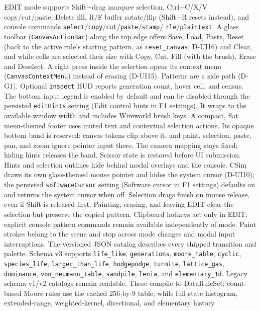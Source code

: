 EDIT mode supports Shift+drag marquee selection, Ctrl+C/X/V copy/cut/paste,
Delete fill, R/F buffer rotate/flip (Shift+R resets instead), and console
commands
\texttt{select}/\texttt{copy}/\texttt{cut}/\texttt{paste}/\texttt{stamp}/
\texttt{rle}/\texttt{plaintext}. A glass toolbar
(\texttt{CanvasActionBar}) along the top edge offers Save, Load, Paste, Reset
(back to the active rule's starting pattern, as \texttt{reset\_canvas};
D-UI16) and Clear, and while cells are selected their size with Copy, Cut, Fill (with the
brush), Erase and Deselect. A right press inside the selection opens its
context menu (\texttt{CanvasContextMenu}) instead of erasing (D-UI15).
Patterns are a side path (D-G1). Optional
\texttt{inspect} HUD reports generation count, hover cell, and census.
The bottom input legend is enabled by default and can be disabled through
the persisted \texttt{editHints} setting (Edit control hints in F1 settings).
It wraps to the available window width and includes Wireworld brush keys.
A compact, flat menu-themed footer uses muted text and contextual selection
actions. Its opaque bottom band is reserved: canvas tokens clip above it, and
paint, selection, paste, pan, and zoom ignore pointer input there. The camera
mapping stays fixed; hiding hints releases the band. Scissor state is restored
before UI submission.
Hints and selection outlines hide behind modal overlays and the console.
CSim draws its own glass-themed mouse pointer and hides the system cursor
(D-UI10); the persisted \texttt{softwareCursor} setting (Software cursor in F1
settings) defaults on and returns the system cursor when off.
Selection drags finish on mouse release, even if Shift is released first.
Painting, erasing, and leaving EDIT clear the selection but preserve the
copied pattern. Clipboard hotkeys act only in EDIT; explicit console pattern
commands remain available independently of mode. Paint strokes belong to
the scene and stop across mode changes and modal input interruptions.
The versioned JSON catalog describes every shipped transition and palette.
Schema v3 supports \texttt{life\_like}, \texttt{generations},
\texttt{moore\_table}, \texttt{cyclic}, \texttt{species\_life},
\texttt{larger\_than\_life}, \texttt{hodgepodge}, \texttt{turmite},
\texttt{lattice\_gas}, \texttt{dominance}, \texttt{von\_neumann\_table},
\texttt{sandpile}, \texttt{lenia}, and \texttt{elementary\_1d}.
Legacy schema-v1/v2 catalogs remain readable. These compile to DataRuleSet;
count-based Moore rules use the cached 256-by-9 table, while full-state
histogram, extended-range, weighted-kernel, directional, and elementary history
